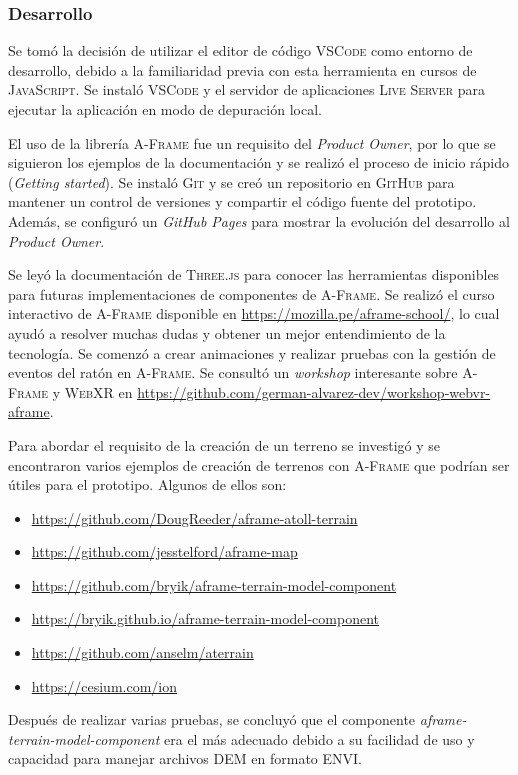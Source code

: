 \documentclass[a4paper, 11pt]{book}
\begin{document}
\subsubsection{Desarrollo}
Se tomó la decisión de utilizar el editor de código \textsc{VSCode} como entorno de desarrollo, debido a la familiaridad previa con esta herramienta en cursos de \textsc{JavaScript}. 
Se instaló \textsc{VSCode} y el servidor de aplicaciones \textsc{Live Server} para ejecutar la aplicación en modo de depuración local.

El uso de la librería \textsc{A-Frame} fue un requisito del \emph{Product Owner}, por lo que se siguieron los ejemplos de la documentación y se realizó el proceso de inicio rápido (\emph{Getting started}).
Se instaló \textsc{Git} y se creó un repositorio en \textsc{GitHub} para mantener un control de versiones y compartir el código fuente del prototipo. 
Además, se configuró un \emph{GitHub Pages} para mostrar la evolución del desarrollo al \emph{Product Owner}.

Se leyó la documentación de \textsc{Three.js} para conocer las herramientas disponibles para futuras implementaciones de componentes de \textsc{A-Frame}.
Se realizó el curso interactivo de \textsc{A-Frame} disponible en \url{https://mozilla.pe/aframe-school/}, lo cual ayudó a resolver muchas dudas y obtener un mejor entendimiento de la tecnología.
Se comenzó a crear animaciones y realizar pruebas con la gestión de eventos del ratón en \textsc{A-Frame}.
Se consultó un \emph{workshop} interesante sobre \textsc{A-Frame} y \textsc{WebXR} en \url{https://github.com/german-alvarez-dev/workshop-webvr-aframe}.

Para abordar el requisito de la creación de un terreno se investigó y se encontraron varios ejemplos de creación de terrenos con \textsc{A-Frame} que podrían ser útiles para el prototipo. 
Algunos de ellos son:
\begin{itemize}
    \item \url{https://github.com/DougReeder/aframe-atoll-terrain}
    \item \url{https://github.com/jesstelford/aframe-map}
    \item \url{https://github.com/bryik/aframe-terrain-model-component}
    \item \url{https://bryik.github.io/aframe-terrain-model-component}
    \item \url{https://github.com/anselm/aterrain}
    \item \url{https://cesium.com/ion}
\end{itemize}
Después de realizar varias pruebas, se concluyó que el componente \emph{aframe-terrain-model-component} era el más adecuado debido a su facilidad de uso y capacidad para manejar archivos \textsc{DEM} en formato \textsc{ENVI}.
\end{document}
